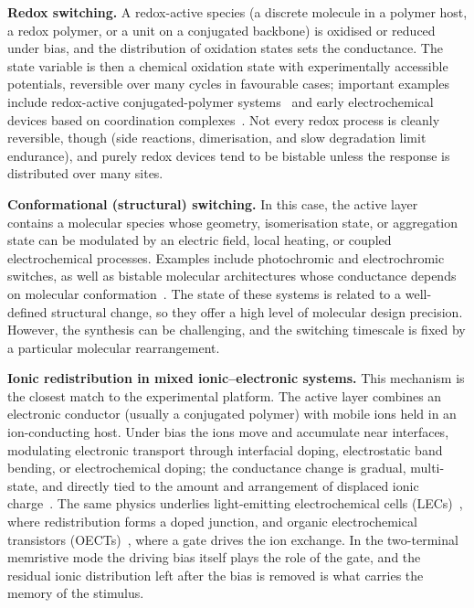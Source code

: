 \documentclass[12pt, twoside]{report}
\begin{document}
\textbf{Redox switching.} A redox-active species (a discrete molecule in a polymer host, a redox polymer, or a unit on a conjugated backbone) is oxidised or reduced under bias, and the distribution of oxidation states sets the conductance. The state variable is then a chemical oxidation state with experimentally accessible potentials, reversible over many cycles in favourable cases; important examples include redox-active conjugated-polymer systems~\cite{Liu2016, Goswami2017, Goswami2020} and early electrochemical devices based on coordination complexes~\cite{Zakhidov2010}. Not every redox process is cleanly reversible, though (side reactions, dimerisation, and slow degradation limit endurance), and purely redox devices tend to be bistable unless the response is distributed over many sites.

\textbf{Conformational (structural) switching.} In this case, the active layer contains a molecular species whose geometry, isomerisation state, or aggregation state can be modulated by an electric field, local heating, or coupled electrochemical processes. Examples include photochromic and electrochromic switches, as well as bistable molecular architectures whose conductance depends on molecular conformation~\cite{Goswami2017, Goswami2020}. The state of these systems is related to a well-defined structural change, so they offer a high level of molecular design precision. However, the synthesis can be challenging, and the switching timescale is fixed by a particular molecular rearrangement.

\textbf{Ionic redistribution in mixed ionic--electronic systems.} This mechanism is the closest match to the experimental platform. The active layer combines an electronic conductor (usually a conjugated polymer) with mobile ions held in an ion-conducting host. Under bias the ions move and accumulate near interfaces, modulating electronic transport through interfacial doping, electrostatic band bending, or electrochemical doping; the conductance change is gradual, multi-state, and directly tied to the amount and arrangement of displaced ionic charge~\cite{VanDeBurgt2018}. The same physics underlies light-emitting electrochemical cells (LECs)~\cite{Pei1995, deMello1998, deMello2002, Matyba2009, vanReenen2010, Wagberg2008, Mardegan2021}, where redistribution forms a doped junction, and organic electrochemical transistors (OECTs)~\cite{Gkoupidenis2015}, where a gate drives the ion exchange. In the two-terminal memristive mode the driving bias itself plays the role of the gate, and the residual ionic distribution left after the bias is removed is what carries the memory of the stimulus.
\end{document}
